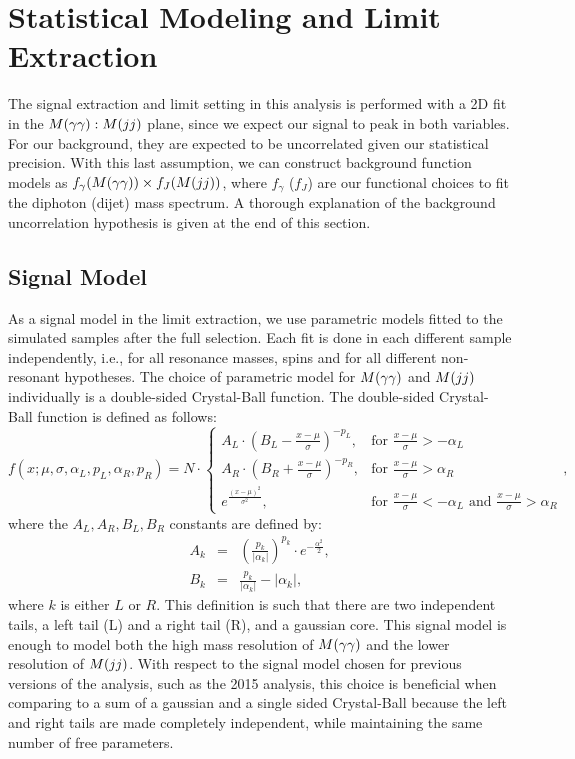 \section{Statistical Modeling and Limit Extraction}
\label{sec:modeling}

The signal extraction and limit setting in this analysis is performed with a 2D fit in the $M(\gamma\gamma):M(jj)$ plane, since we expect our signal to peak in both variables. For our background, they are expected to be uncorrelated given our statistical precision. With this last assumption, we can construct background function models as $f_{\gamma}(M(\gamma\gamma))\times f_{J}(M(jj))$, where $f_{\gamma}$ ($f_{J}$) are our functional choices to fit the diphoton (dijet) mass spectrum. A thorough explanation of the background uncorrelation hypothesis is given at the end of this section.


\subsection{Signal Model}

As a signal model in the limit extraction, we use parametric models fitted to the simulated samples after the full selection. 
Each fit is done in each different sample independently, i.e., for all resonance masses, spins and for all different non-resonant hypotheses. 
The choice of parametric model for $M(\gamma\gamma)$ and $M(jj)$ individually is a double-sided Crystal-Ball function. 
The double-sided Crystal-Ball function is defined as follows:
\begin{equation}
f(x;\mu, \sigma, \alpha_{L}, p_{L}, \alpha_{R}, p_{R}) = N \cdot 
\begin{cases} 
A_{L} \cdot \left( B_{L} - \frac{x - \mu}{\sigma} \right)^{-p_{L}}, & \mbox{for } \frac{x - \mu}{\sigma} > - \alpha_{L} \\
A_{R} \cdot \left( B_{R} + \frac{x - \mu}{\sigma} \right)^{-p_{R}}, & \mbox{for } \frac{x - \mu}{\sigma} > \alpha_{R} \\
e^{  \frac{\left( x - \mu \right)^{2}}{\sigma^{2}} }, & \mbox{for } \frac{x - \mu}{\sigma} < - \alpha_{L}  \mbox{ and } \frac{x - \mu}{\sigma} > \alpha_{R}
 \end{cases},
 \end{equation}
 where the $A_{L}, A_{R}, B_{L}, B_{R}$ constants are defined by:
 \begin{eqnarray}
 A_{k} &=& \left( \frac{p_{k}}{\left| \alpha_{k} \right|} \right)^{p_{k}} \cdot e^{-\frac{\alpha^{2}}{2}}, \\
 B_{k} &=& \frac{p_{k}}{\left| \alpha_{k} \right|} - \left| \alpha_{k} \right|,
 \end{eqnarray}
 where $k$ is either $L$ or $R$. This definition is such that there are two independent tails, a left tail (L) and a right tail (R), and a gaussian core.  
This signal model is enough to model both the high mass resolution of $M(\gamma\gamma)$ and the lower resolution of $M(jj)$. 
With respect to the signal model chosen for previous versions of the analysis, such as the 2015 analysis, this choice is beneficial when comparing to a sum of a gaussian and a single sided Crystal-Ball because the left and right tails are made completely independent, while maintaining the same number of free parameters.


